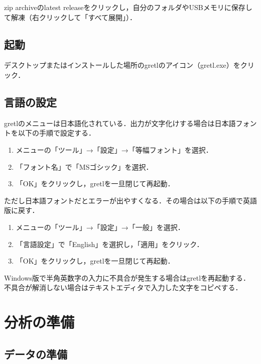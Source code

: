 \documentclass[
]{jlreq}
\providecommand{\tightlist}{%
  \setlength{\itemsep}{0pt}\setlength{\parskip}{0pt}}
\begin{document}
zip archiveのlatest releaseをクリックし，自分のフォルダやUSBメモリに保存して解凍（右クリックして「すべて展開」）．

\subsection{起動}\label{ux8d77ux52d5}

デスクトップまたはインストールした場所のgretlのアイコン（gretl.exe）をクリック．

\subsection{言語の設定}\label{ux8a00ux8a9eux306eux8a2dux5b9a}

gretlのメニューは日本語化されている．出力が文字化けする場合は日本語フォントを以下の手順で設定する．

\begin{enumerate}
\def\labelenumi{\arabic{enumi}.}
\tightlist
\item
  メニューの「ツール」→「設定」→「等幅フォント」を選択．
\item
  「フォント名」で「MSゴシック」を選択．
\item
  「OK」をクリックし，gretlを一旦閉じて再起動．
\end{enumerate}

ただし日本語フォントだとエラーが出やすくなる．その場合は以下の手順で英語版に戻す．

\begin{enumerate}
\def\labelenumi{\arabic{enumi}.}
\tightlist
\item
  メニューの「ツール」→「設定」→「一般」を選択．
\item
  「言語設定」で「English」を選択し，「適用」をクリック．
\item
  「OK」をクリックし，gretlを一旦閉じて再起動．
\end{enumerate}

Windows版で半角英数字の入力に不具合が発生する場合はgretlを再起動する．不具合が解消しない場合はテキストエディタで入力した文字をコピペする．

\section{分析の準備}\label{ux5206ux6790ux306eux6e96ux5099}

\subsection{データの準備}\label{ux30c7ux30fcux30bfux306eux6e96ux5099}
\end{document}
